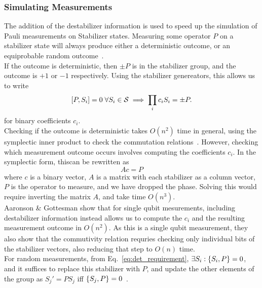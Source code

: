 \subsubsection*{Simulating Measurements}
The addition of the destabilizer information is  used to speed up the simulation of Pauli measurements on Stabilizer states. Measuring some operator $P$ on a stabilizer state will always produce either a deterministic outcome, or an equiprobable random outcome~\cite{Gottesman1998b}.\\
If the outcome is deterministic, then $\pm P$ is in the stabilizer group, and the outcome is $+1$ or $-1$ respectively. Using the stabilizer genereators, this allows us to write 
\begin{equation}
    \comm{P}{S_{i}}=0\;\forall S_{i}\in\mathcal{S} \implies \prod_{i}c_{i}S_{i} = \pm P. \label{eq:det_requirement}
\end{equation}
for binary coefficients $c_{i}$.\\
Checking if the outcome is deterministic takes $O(n^{2})$ time in general, using the symplectic inner product to check the commutation relations~\cite{Dehaene2003}. However, checking which measurement outcome occurs involves computing the coefficients $c_{i}$. In the symplectic form, thiscan be rewritten as
\begin{equation}
    Ac=P
\end{equation}
where $c$ is a binary vector, $A$ is a matrix with each stabilizer as a column vector, $P$ is the operator to measure, and we have dropped the phase. Solving this would require inverting the matrix $A$, and take time $O(n^{3})$.\\
Aaronson \& Gottesman show that for single qubit mesurements, including destabilizer information instead allows us to compute the $c_{i}$ and the resulting measurement outcome in $O(n^{2})$. As this is a single qubit measurement, they also show that the commutivity relation requries checking only individual bits of the stabilizer vectors, also reducing that step to $O(n)$ time.\\
For random measurements, from Eq.~\ref{eq:det_requirement}, $\exists S_{i}:\acomm{S_{i}}{P}=0$, and it suffices to replace this stabilizer with $P$, and update the other elements of the group as $S_{j}'=PS_{j}$ iff $\acomm{S_{j}}{P}=0$~\cite{Gottesman1998b,Aaronson2004}.
